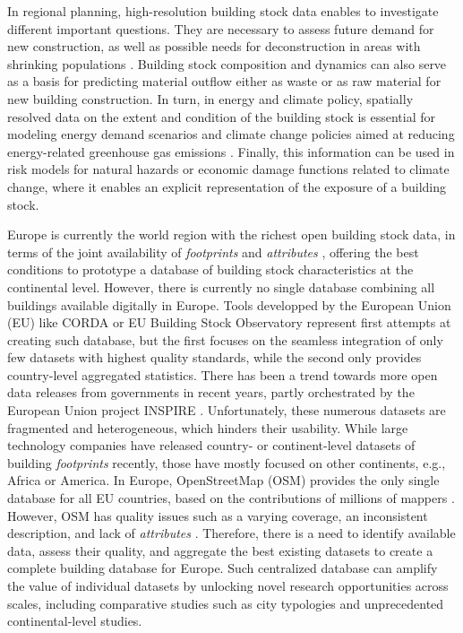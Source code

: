 \documentclass[fleqn,10pt]{wlscirep}
\begin{document}
In regional planning, high-resolution building stock data enables to investigate different important questions. They are necessary to assess future demand for new construction, as well as possible needs for deconstruction in areas with shrinking populations \cite{bai2018six,creutzig2016urban,thacker2019infrastructure}. Building stock composition and dynamics can also serve as a basis for predicting material outflow either as waste or as raw material for new building construction\cite{heeren2019tracking,heeren2019database,lanauTakingStockBuilt2019,kohlerResearchBuildingStock2009}. In turn, in energy and climate policy, spatially resolved data on the extent and condition of the building stock is essential for modeling energy demand scenarios and climate change policies aimed at reducing energy-related greenhouse gas emissions \cite{buffat2017big,wang2022data,milojevic2021machine}. Finally, this information can be used in risk models for natural hazards  or economic damage functions related to climate change, where it enables an explicit representation of the exposure of a building stock.

Europe is currently the world region with the richest open building stock data, in terms of the joint availability of \textit{footprints} and \textit{attributes} \cite{biljecki2021open}, offering the best conditions to prototype a database of building stock characteristics at the continental level. However, there is currently no single database combining all buildings available digitally in Europe. Tools developped by the European Union (EU) like CORDA\cite{corda22} or EU Building Stock Observatory\cite{EU-BSO-22} represent first attempts at creating such database, but the first focuses on the seamless integration of only few datasets with highest quality standards, while the second only provides country-level aggregated statistics.  There has been a trend towards more open data releases from governments in recent years, partly orchestrated by the European Union project INSPIRE \cite{inspire2022,bartha2011standardization}. Unfortunately, these numerous datasets are fragmented and heterogeneous, which hinders their usability. While large technology companies have released country- or continent-level datasets of building \textit{footprints} recently, those have mostly focused on other continents, e.g., Africa or America\cite{sirko2021continental,bing2022}. In Europe, 
OpenStreetMap (OSM) provides the only single database for all EU countries, based on the contributions of millions of mappers \cite{haklay2008openstreetmap,mooney2017review,sarretta2021towards}. However, OSM has quality issues such as a varying coverage, an inconsistent description, and lack of \textit{attributes} \cite{sarretta2021towards,biljecki2021open}. 
Therefore, there is a need to identify available data, assess their quality, and aggregate the best existing datasets to create a complete building database for Europe. Such centralized database can amplify the value of individual datasets by unlocking novel research opportunities across scales\cite{seto2017sustainability,elmqvist2021urbanization,creutzig2015towards,milojevic2021machine}, including comparative studies such as city typologies \cite{creutzig2015towards} and unprecedented continental-level studies. 
\end{document}
